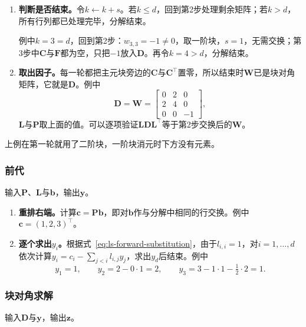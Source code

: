 \begin{enumerate}
 尾块更新为
 \[
  2-\bigl(1\cdot1+\tfrac12\cdot4\bigr)=-1 .
 \]
 于是
 \[
  \bm W=\begin{bmatrix}0&2&0\\2&4&0\\0&0&-1\end{bmatrix},\quad
  \bm L=\begin{bmatrix}1&0&0\\0&1&0\\1&\tfrac12&1\end{bmatrix},\quad
  \bm D\text{的第一块为}\ \bm E .
 \]

 \item \textbf{判断是否结束。}令$k\leftarrow k+s$。若$k\leq d$，回到第2步处理剩余矩阵；若$k>d$，所有行列都已处理完毕，分解结束。

 例中$k=3=d$，回到第2步：$w_{3,3}=-1\neq0$，取一阶块，$s=1$，无需交换；第3步中$\bm C$与$\bm F$都为空，只把$-1$放入$\bm D$。再令$k=4>d$，分解结束。

 \item \textbf{取出因子。}每一轮都把主元块旁边的$\bm C$与$\bm C^\top$置零，所以结束时$\bm W$已是块对角矩阵，它就是$\bm D$。例中
 \[
  \bm D=\bm W=\begin{bmatrix}0&2&0\\2&4&0\\0&0&-1\end{bmatrix},
 \]
 $\bm L$与$\bm P$取上面的值。可以逐项验证$\bm L\bm D\bm L^\top$等于第2步交换后的$\bm W$。
\end{enumerate}

上例在第一轮就用了二阶块，一阶块消元时下方没有元素。

\subsubsection{前代}
输入$\bm P$、$\bm L$与$\bm b$，输出$\bm y$。
\begin{enumerate}
 \item \textbf{重排右端。}计算$\bm c=\bm P\bm b$，即对$\bm b$作与分解中相同的行交换。例中$\bm c=(1,2,3)^\top$。

 \item \textbf{逐个求出$y_i$。}根据式~\eqref{eq:ls-forward-substitution}，由于$l_{i,i}=1$，对$i=1,\ldots,d$依次计算$y_i=c_i-\sum_{j<i}l_{i,j}y_j$，求出$y_d$后结束。例中
 \[
  y_1=1,\qquad
  y_2=2-0\cdot1=2,\qquad
  y_3=3-1\cdot1-\tfrac12\cdot2=1 .
 \]
\end{enumerate}

\subsubsection{块对角求解}
输入$\bm D$与$\bm y$，输出$\bm z$。

